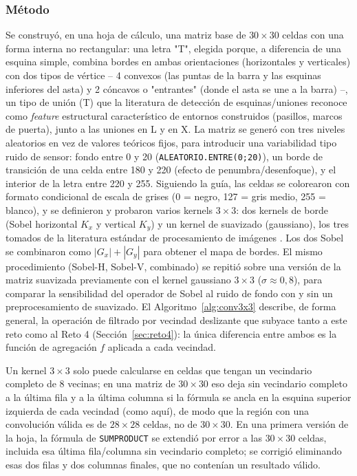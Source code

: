 \documentclass[11pt]{article}
\begin{document}
\subsubsection{Método}
Se construyó, en una hoja de cálculo, una matriz base de $30\times 30$
celdas con una forma interna no rectangular: una letra "T", elegida porque,
a diferencia de una esquina simple, combina bordes en ambas orientaciones
(horizontales y verticales) con dos tipos de vértice -- 4 convexos (las
puntas de la barra y las esquinas inferiores del asta) y 2 cóncavos o
"entrantes" (donde el asta se une a la barra) --, un tipo de unión (T) que
la literatura de detección de esquinas/uniones reconoce como \emph{feature}
estructural característico de entornos construidos (pasillos, marcos de
puerta), junto a las uniones en L y en X. La matriz se generó con tres
niveles aleatorios en vez de valores teóricos fijos, para introducir una
variabilidad tipo ruido de sensor: fondo entre 0 y 20
(\texttt{ALEATORIO.ENTRE(0;20)}), un borde de transición de una celda entre
180 y 220 (efecto de penumbra/desenfoque), y el interior de la letra entre
220 y 255. Siguiendo la guía, las celdas se colorearon con formato
condicional de escala de grises (0 = negro, 127 = gris medio, 255 =
blanco), y se definieron y probaron varios kernels $3\times 3$: dos
kernels de borde (Sobel horizontal $K_x$ y vertical $K_y$) y un kernel de
suavizado (gaussiano), los tres tomados de la literatura estándar de
procesamiento de imágenes \citep{gonzalez2018digital}. Los dos Sobel se
combinaron como $|G_x|+|G_y|$ para obtener el mapa de bordes. El mismo
procedimiento (Sobel-H, Sobel-V, combinado) se repitió sobre una versión
de la matriz suavizada previamente con el kernel gaussiano $3\times 3$
($\sigma\approx 0{,}8$), para comparar la sensibilidad del operador de
Sobel al ruido de fondo con y sin un preprocesamiento de suavizado. El
Algoritmo~\ref{alg:conv3x3} describe, de forma general, la operación de
filtrado por vecindad deslizante que subyace tanto a este reto como al
Reto 4 (Sección~\ref{sec:reto4}): la única diferencia entre ambos es la
función de agregación $f$ aplicada a cada vecindad.

Un kernel $3\times 3$ solo puede calcularse en celdas que tengan un
vecindario completo de 8 vecinas; en una matriz de $30\times 30$ eso deja
sin vecindario completo a la última fila y a la última columna si la
fórmula se ancla en la esquina superior izquierda de cada vecindad (como
aquí), de modo que la región con una convolución válida es de
$28\times 28$ celdas, no de $30\times 30$. En una primera versión de la
hoja, la fórmula de \texttt{SUMPRODUCT} se extendió por error a las
$30\times 30$ celdas, incluida esa última fila/columna sin vecindario
completo; se corrigió eliminando esas dos filas y dos columnas finales,
que no contenían un resultado válido.
\end{document}

